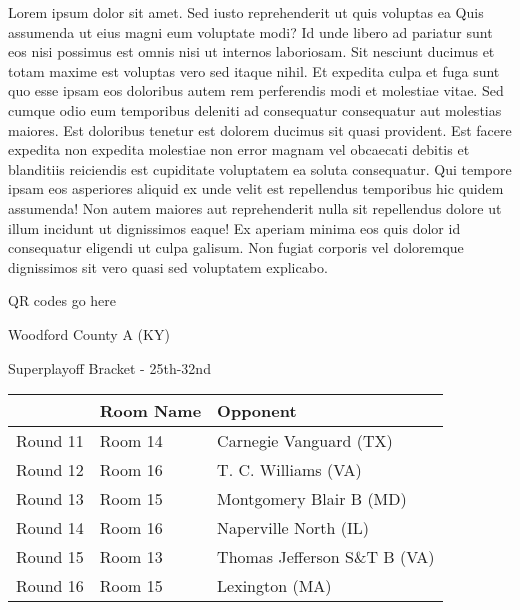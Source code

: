 \documentclass{article}%
\begin{document}
\vspace*{8pt}%
\linebreak%
\newline%
\newline%
    Lorem ipsum dolor sit amet. Sed iusto reprehenderit ut quis voluptas ea Quis assumenda ut eius magni eum voluptate modi? Id unde libero ad pariatur sunt eos nisi possimus est omnis nisi ut internos laboriosam. Sit nesciunt ducimus et totam maxime est voluptas vero sed itaque nihil. Et expedita culpa et fuga sunt quo esse ipsam eos doloribus autem rem perferendis modi et molestiae vitae.\newline%
\newline%
    Sed cumque odio eum temporibus deleniti ad consequatur consequatur aut molestias maiores. Est doloribus tenetur est dolorem ducimus sit quasi provident. Est facere expedita non expedita molestiae non error magnam vel obcaecati debitis et blanditiis reiciendis est cupiditate voluptatem ea soluta consequatur. Qui tempore ipsam eos asperiores aliquid ex unde velit est repellendus temporibus hic quidem assumenda!\newline%
\newline%
    Non autem maiores aut reprehenderit nulla sit repellendus dolore ut illum incidunt ut dignissimos eaque! Ex aperiam minima eos quis dolor id consequatur eligendi ut culpa galisum. Non fugiat corporis vel doloremque dignissimos sit vero quasi sed voluptatem explicabo.\newline%
\newline%
\vspace*{30pt}%
\begin{center}%
\begin{Huge}%
QR codes go here%
\end{Huge}%
\end{center}%
\newpage%
\begin{center}%
\begin{Huge}%
Woodford County A (KY)%
\end{Huge}%
\vspace*{8pt}%
\linebreak%
\begin{Large}%
Superplayoff Bracket {-} 25th{-}32nd%
\end{Large}%
\end{center}%
%
\begin{tabularx}{\textwidth}{|c|Y|Y|}%
\hline%
&Room Name&Opponent\\%
\hline%
Round 11&Room 14&Carnegie Vanguard (TX)\\%
Round 12&Room 16&T. C. Williams (VA)\\%
Round 13&Room 15&Montgomery Blair B (MD)\\%
Round 14&Room 16&Naperville North (IL)\\%
Round 15&Room 13&Thomas Jefferson S\&T B (VA)\\%
Round 16&Room 15&Lexington (MA)\\%
\hline%
\end{tabularx}%
\end{document}
